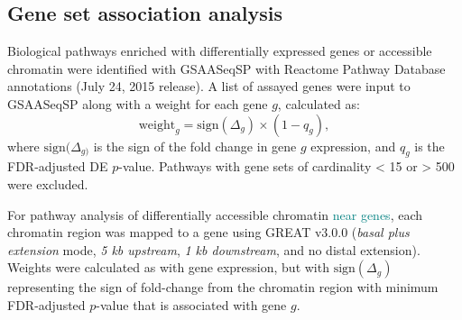 \documentclass[9pt,twocolumn,twoside]{gsajnl}
\newcommand{\WV}[2]{\textcolor{red}{#1\footnote{\textcolor{red}{WV: #2}}}}
\newcommand{\WVinline}[1]{\textcolor{red}{#1}}
\newcommand{\GK}[2]{\textcolor{teal}{#1\footnote{\textcolor{teal}{GK: #2}}}}
\newcommand{\GKinline}[1]{\textcolor{teal}{#1}}
\newcommand{\GKst}[1]{\textcolor{teal}{\st{#1}}}
\begin{document}
\subsection{Gene set association analysis}

Biological pathways enriched with differentially expressed genes or accessible chromatin were identified with GSAASeqSP \citep{Xiong2014} with Reactome Pathway Database annotations (July 24, 2015 release). A list of assayed genes were input to GSAASeqSP along with a weight for each gene $g$, calculated as:
\begin{equation}
\text{weight}_{g} = \text{sign}(\Delta_{g}) \times (1-q_{g}),
\label{eq:gene_weighting}
\end{equation}
where $\text{sign}(\Delta_{g)}$ is the sign of the fold change in gene $g$ expression, and $q_{g}$ is the FDR-adjusted DE $p$-value. Pathways with gene sets of cardinality < 15 or > 500 were excluded. 

For pathway analysis of differentially accessible chromatin \GKinline{near genes}, each chromatin region was mapped to a gene using GREAT v3.0.0 (\textit{basal plus extension} mode, \textit{5 kb upstream}, \textit{1 kb downstream}, and no distal extension). 
Weights were calculated as with gene expression, but with $\text{sign}(\Delta_{g})$ representing the sign of fold-change from the chromatin region with minimum FDR-adjusted $p$-value that is associated with gene $g$.

\end{document}
